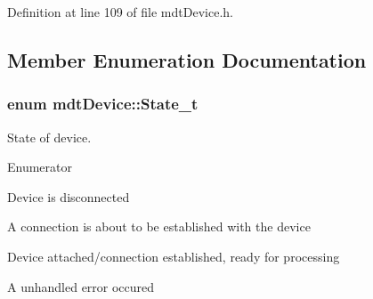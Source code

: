 Definition at line 109 of file mdt\-Device.\-h.



\subsection{Member Enumeration Documentation}
\hypertarget{classmdt_device_a8bcf508fbd38a8f0b235e8a9b00319f6}{
\subsubsection[{State\-\_\-t}]{\setlength{\rightskip}{0pt plus 5cm}enum {\bf mdt\-Device\-::\-State\-\_\-t}\hspace{0.3cm}{\ttfamily [strong]}}}\label{classmdt_device_a8bcf508fbd38a8f0b235e8a9b00319f6}


State of device. 

\begin{Desc}
\item[Enumerator]\par
\begin{description}
\item[{\em 
\hypertarget{classmdt_device_a8bcf508fbd38a8f0b235e8a9b00319f6aef70e46fd3bbc21e3e1f0b6815e750c0}{Disconnected}\label{classmdt_device_a8bcf508fbd38a8f0b235e8a9b00319f6aef70e46fd3bbc21e3e1f0b6815e750c0}
}]Device is disconnected \item[{\em 
\hypertarget{classmdt_device_a8bcf508fbd38a8f0b235e8a9b00319f6ae321c53b354930ba96f0243e652df458}{Connecting}\label{classmdt_device_a8bcf508fbd38a8f0b235e8a9b00319f6ae321c53b354930ba96f0243e652df458}
}]A connection is about to be established with the device \item[{\em 
\hypertarget{classmdt_device_a8bcf508fbd38a8f0b235e8a9b00319f6ae7d31fc0602fb2ede144d18cdffd816b}{Ready}\label{classmdt_device_a8bcf508fbd38a8f0b235e8a9b00319f6ae7d31fc0602fb2ede144d18cdffd816b}
}]Device attached/connection established, ready for processing \item[{\em 
\hypertarget{classmdt_device_a8bcf508fbd38a8f0b235e8a9b00319f6a902b0d55fddef6f8d651fe1035b7d4bd}{Error}\label{classmdt_device_a8bcf508fbd38a8f0b235e8a9b00319f6a902b0d55fddef6f8d651fe1035b7d4bd}
}]A unhandled error occured \end{description}
\end{Desc}



